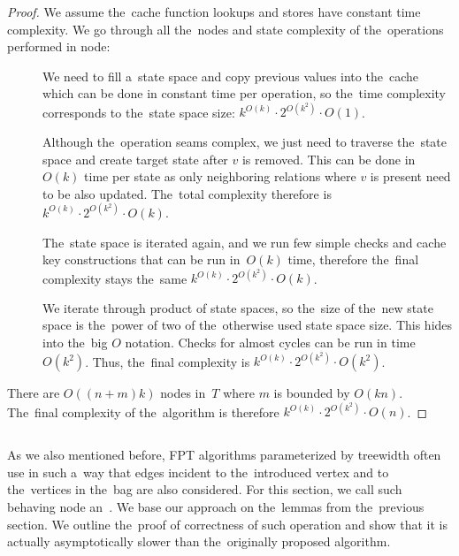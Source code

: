 \begin{proof}
	We assume the~cache function lookups and stores have constant time complexity.
	We go through all the~nodes and state complexity of the~operations performed in node:
	\begin{description}
		\item[\IntroduceVertexNode{}]
		      We need to fill a~state space and copy previous values into the~cache
		      which can be done in constant time per operation,
		      so the~time complexity corresponds to the~state space size:
		      \( {k}^{O(k)} \cdot 2^{O(k^2)} \cdot O(1) \).
		\item[\ForgetVertexNode{}]
		      Although the~operation seams complex, we just need to traverse the~state space
		      and create target state after \( v \) is removed.
		      This can be done in~\( O(k) \) time
		      per state as only neighboring relations where \( v \) is present
		      need to be also updated.
		      The~total complexity therefore is
		      \( {k}^{O(k)} \cdot 2^{O(k^2)} \cdot O(k) \).
		\item[\IntroduceEdgeNode{}]
		      The~state space is iterated again, and we run few simple checks and cache key constructions
		      that can be run in~\( O(k) \) time, therefore the~final complexity stays the~same
		      \( {k}^{O(k)} \cdot 2^{O(k^2)} \cdot O(k) \).
		\item[\JoinNode{}]
		      We iterate through product of state spaces,
		      so the~size of the~new state space is the~power of two
		      of the~otherwise used state space size.
		      This hides into the~big \( O \) notation.
		      Checks for almost cycles can be run in time \( O(k^2) \).
		      Thus, the~final complexity is
		      \( {k}^{O(k)} \cdot 2^{O(k^2)} \cdot O(k^2) \).
	\end{description}
	There are \( O((n+m)k) \) nodes in~\( T \) where \( m \) is bounded by \( O(kn) \).
	The~final complexity of the~algorithm is therefore
	\( {k}^{O(k)} \cdot 2^{O(k^2)} \cdot O(n) \).
\end{proof}
%

\subsection{\IntroduceVertexWithEdgesNode{}}

As we also mentioned before, FPT algorithms parameterized by treewidth
often use \IntroduceVertexNode{} in such a~way
that edges incident to the~introduced vertex and to
the~vertices in the~bag are also considered.
For this section, we call such behaving node an~\IntroduceVertexWithEdgesNode{}.
%
We base our approach on the~lemmas from the~previous section.
We outline the~proof of correctness of such operation and show
that it is actually asymptotically slower than the~originally proposed algorithm.

